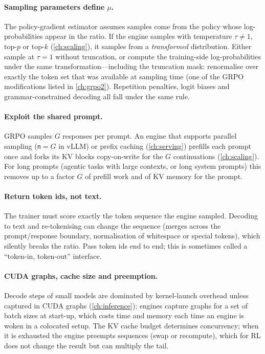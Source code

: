 \paragraph{Sampling parameters define $\mu$.} The policy-gradient estimator assumes samples
come from the policy whose log-probabilities appear in the ratio. If the engine samples with
temperature $\tau\neq 1$, top-$p$ or top-$k$ (\cref{ch:scaling}), it samples from a
\emph{transformed} distribution. Either sample at $\tau=1$ without truncation, or compute the
training-side log-probabilities under the same transformation---including the truncation
mask: renormalise over exactly the token set that was available at sampling time (one of the
GRPO modifications listed in \cref{ch:grpo2}). Repetition penalties, logit biases and
grammar-constrained decoding all fall under the same rule.

\paragraph{Exploit the shared prompt.} GRPO samples $G$ responses per prompt. An engine that
supports parallel sampling (\texttt{n}$=G$ in vLLM) or prefix caching (\cref{ch:serving})
prefills each prompt once and forks its KV blocks copy-on-write for the $G$ continuations
(\cref{ch:scaling}). For long prompts (agentic tasks with large contexts, or long
system prompts) this removes up to a factor $G$ of prefill work and of KV memory for the
prompt.

\paragraph{Return token ids, not text.} The trainer must score exactly the token sequence the
engine sampled. Decoding to text and re-tokenising can change the sequence (merges across the
prompt/response boundary, normalisation of whitespace or special tokens), which silently
breaks the ratio. Pass token ids end to end; this is sometimes called a
``token-in, token-out'' interface.

\paragraph{CUDA graphs, cache size and preemption.} Decode steps of small models are dominated
by kernel-launch overhead unless captured in CUDA graphs (\cref{ch:inference}); engines
capture graphs for a set of batch sizes at start-up, which costs time and memory each time an
engine is woken in a colocated setup. The KV cache budget determines concurrency; when it is
exhausted the engine preempts sequences (swap or recompute), which for RL does not change the
result but can multiply the tail.

